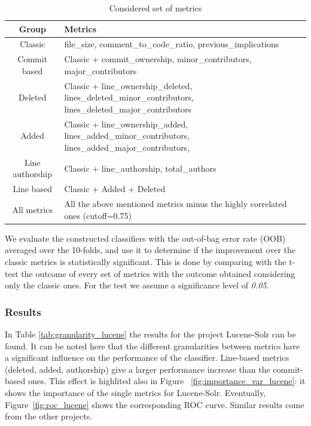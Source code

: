\begin{table}[ht]
    \centering
    \footnotesize
    \caption{Considered set of metrics}
    \label{tab:metric_groups}
    \begin{tabular}{|c|p{}|}
        \hline
        \textbf{Group} & \textbf{Metrics} \\
        \hline
        Classic & file\_size, comment\_to\_code\_ratio, previous\_implications \\
        \hline
        Commit based & Classic + commit\_ownership, minor\_contributors, major\_contributors \\
        \hline
        Deleted  & Classic + line\_ownership\_deleted, lines\_deleted\_minor\_contributors, lines\_deleted\_major\_contributors \\
        \hline
        Added  & Classic + line\_ownership\_added, lines\_added\_minor\_contributors, lines\_added\_major\_contributors,\\
        \hline
        Line authorship  & Classic + line\_authorship, total\_authors\\
        \hline
        Line based  & Classic + Added + Deleted \\
        \hline
        All metrics  & All the above mentioned metrics minus the highly correlated ones (cutoff=0.75)\\
        \hline
    \end{tabular}
\end{table}

We evaluate the constructed classifiers with the out-of-bag error rate (OOB) averaged over the 10-folds, and use it to determine if the improvement over the classic metrics is statistically significant. This is done by comparing with the t-test the outcome of every set of metrics with the outcome obtained considering only the classic ones. For the test we assume a significance level of \textit{0.05}.


\subsubsection{Results}

In Table \ref{tab:granularity_lucene} the results for the project Lucene-Solr can be found. It can be noted here that the different granularities between metrics have a significant influence on the performance of the classifier. Line-based metrics (deleted, added, authorship) give a larger performance increase than the commit-based ones. This effect is highlited also in Figure~ \ref{fig:importance_var_lucene}: it shows the importance of the single metrics for Lucene-Solr. Eventually, Figure~\ref{fig:roc_lucene} shows the corresponding ROC curve. Similar results come from the other projects.

